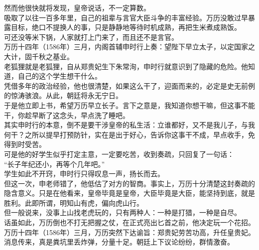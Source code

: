 \begin{multicols}{\theparacolNo}
然而他很快就将发现，皇帝说话，不一定算数。\\

吸取了以往一百多年里，自己的祖辈与言官大臣斗争的丰富经验。万历没敢过早暴露目标，绝口不提换人的事，只是静静地等待时机成熟，再把生米煮成熟饭。\\

可还没等米下锅，人家就打上门来了，而且还不是言官。\\

万历十四年（1586年）三月，内阁首辅申时行上奏：望陛下早立太子，以定国家之大计，固千秋之基业。\\

老狐狸就是老狐狸，自从郑贵妃生下朱常洵，申时行就意识到了隐藏的危险。他知道，自己的这个学生想干什么。\\

凭借多年的政治经验，他也很清楚，如果这么干了，迎面而来的，必定是史无前例的惊涛骇浪。从此，朝廷将永无宁日。\\

于是他立即上书，希望万历早立长子。言下之意是，我知道你想干嘛，但这事不能干，你趁早断了这念头，早点洗了睡吧。\\

其实申时行的本意，倒不是要干涉皇帝的私生活：立谁都好，又不是我儿子，与我何干？之所以提早打预防针，实在是出于好心，告诉你这事干不成，早点收手，免得到时受苦。\\

可是他的好学生似乎打定主意，一定要吃苦，收到奏疏，只回复了一句话：\\

“长子年纪还小，再等个几年吧。”\\

学生如此不开窍，申时行只得叹息一声，扬长而去。\\

但这一次，申老师错了，他低估了对方的智商。事实上，万历十分清楚这封奏疏的隐含意义。只是在他看来，皇帝毕竟是皇帝，大臣毕竟是大臣，能坚持到底，就是胜利。此即所谓，明知山有虎，偏向虎山行。\\

但一般说来，没事上山找老虎玩的，只有两种人：一种是打猎，一种是自尽。\\

话虽如此，万历倒也不打无把握之仗，在正式亮出匕首之前，他决定玩一个花招。\\

万历十四年（1586年）三月，万历突然下达谕旨：郑贵妃劳苦功高，升任皇贵妃。\\

消息传来，真是粪坑里丢炸弹，分量十足。朝廷上下议论纷纷，群情激奋。\\


\end{multicols}
